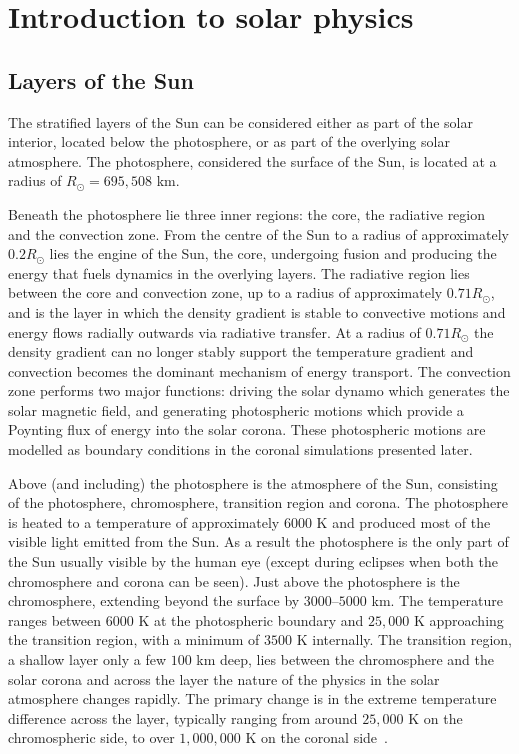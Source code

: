 \section{Introduction to solar physics}

\subsection{Layers of the Sun}

The stratified layers of the Sun can be considered either as part of the solar interior, located below the photosphere, or as part of the overlying solar atmosphere. The photosphere, considered the surface of the Sun, is located at a radius of $R_{\odot} = 695,508$ km.

Beneath the photosphere lie three inner regions: the core, the radiative region and the convection zone. From the centre of the Sun to a radius of approximately $0.2 R_{\odot}$ lies the engine of the Sun, the core, undergoing fusion and producing the energy that fuels dynamics in the overlying layers. The radiative region lies between the core and convection zone, up to a radius of approximately $0.71R_{\odot}$, and is the layer in which the density gradient is stable to convective motions and energy flows radially outwards via radiative transfer. At a radius of $0.71R_{\odot}$ the density gradient can no longer stably support the temperature gradient and convection becomes the dominant mechanism of energy transport. The convection zone performs two major functions: driving the solar dynamo which generates the solar magnetic field, and generating photospheric motions which provide a Poynting flux of energy into the solar corona. These photospheric motions are modelled as boundary conditions in the coronal simulations presented later.

Above (and including) the photosphere is the atmosphere of the Sun, consisting of the photosphere, chromosphere, transition region and corona. The photosphere is heated to a temperature of approximately $6000$ K and produced most of the visible light emitted from the Sun. As a result the photosphere is the only part of the Sun usually visible by the human eye (except during eclipses when both the chromosphere and corona can be seen). Just above the photosphere is the chromosphere, extending beyond the surface by $3000$--$5000$ km. The temperature ranges between $6000$ K at the photospheric boundary and $25,000$ K approaching the transition region, with a minimum of $3500$ K internally. The transition region, a shallow layer only a few $100$ km deep, lies between the chromosphere and the solar corona and across the layer the nature of the physics in the solar atmosphere changes rapidly. The primary change is in the extreme temperature difference across the layer, typically ranging from around $25,000$ K on the chromospheric side, to over $1,000,000$ K on the coronal side~\cite{priestMagnetohydrodynamicsSuna,mandriniMagneticFieldPlasma2000}. 

